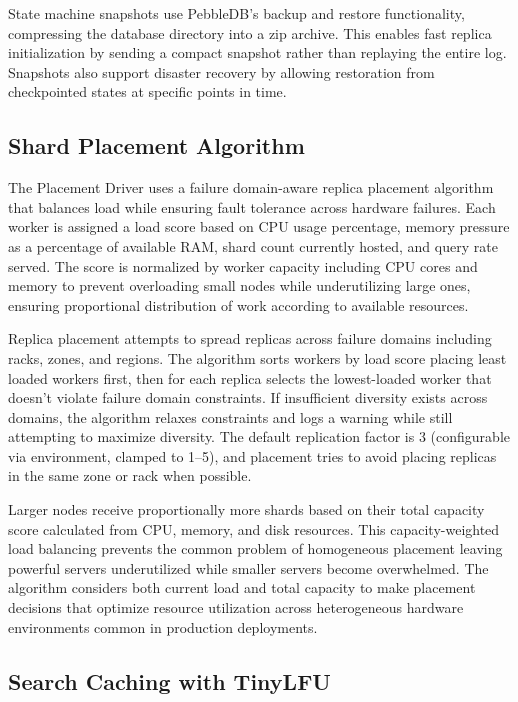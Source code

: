 \documentclass[conference]{IEEEtran}
\begin{document}
State machine snapshots use PebbleDB's backup and restore functionality, compressing the database directory into a zip archive. This enables fast replica initialization by sending a compact snapshot rather than replaying the entire log. Snapshots also support disaster recovery by allowing restoration from checkpointed states at specific points in time.

\subsection{Shard Placement Algorithm}

The Placement Driver uses a failure domain-aware replica placement algorithm that balances load while ensuring fault tolerance across hardware failures. Each worker is assigned a load score based on CPU usage percentage, memory pressure as a percentage of available RAM, shard count currently hosted, and query rate served. The score is normalized by worker capacity including CPU cores and memory to prevent overloading small nodes while underutilizing large ones, ensuring proportional distribution of work according to available resources.

Replica placement attempts to spread replicas across failure domains including racks, zones, and regions. The algorithm sorts workers by load score placing least loaded workers first, then for each replica selects the lowest-loaded worker that doesn't violate failure domain constraints. If insufficient diversity exists across domains, the algorithm relaxes constraints and logs a warning while still attempting to maximize diversity. The default replication factor is 3 (configurable via environment, clamped to 1--5), and placement tries to avoid placing replicas in the same zone or rack when possible.

Larger nodes receive proportionally more shards based on their total capacity score calculated from CPU, memory, and disk resources. This capacity-weighted load balancing prevents the common problem of homogeneous placement leaving powerful servers underutilized while smaller servers become overwhelmed. The algorithm considers both current load and total capacity to make placement decisions that optimize resource utilization across heterogeneous hardware environments common in production deployments.

\subsection{Search Caching with TinyLFU}
\end{document}
